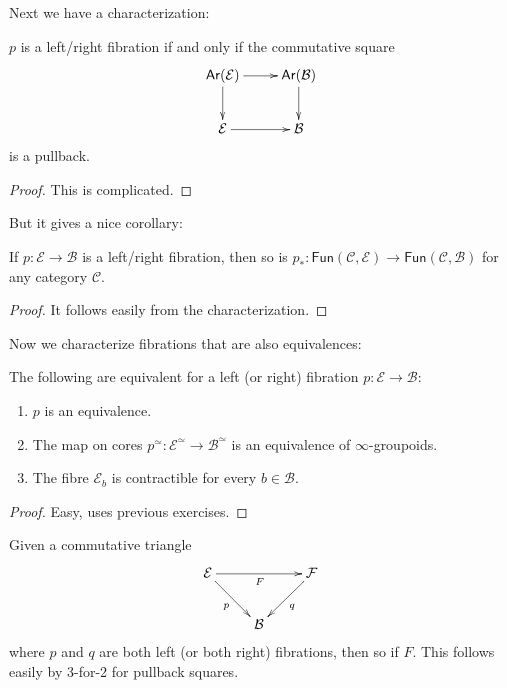 \noindent
Next we have a characterization:

\begin{proposition}
\label{proposition-fibration-characterization}
$p$ is a left/right fibration if and only if the commutative square
$$
\xymatrix{
\mathsf{Ar}(\mathcal{E})\ar[r]\ar[d]&\mathsf{Ar}(\mathcal{B})\ar[d]\\
\mathcal{E}\ar[r]&\mathcal{B}
}
$$
is a pullback.
\end{proposition}

\begin{proof}
This is complicated.
\end{proof}

\noindent
But it gives a nice corollary:

\begin{lemma}
\label{lemma-induced-map-fibration}
If $p:\mathcal{E}\to\mathcal{B}$ is a left/right fibration,
then so is $p_*:
\mathsf{Fun}(\mathcal{C},\mathcal{E})\to\mathsf{Fun}(\mathcal{C},\mathcal{B})$ 
for any category $\mathcal{C}$.
\end{lemma}

\begin{proof}
It follows easily from the characterization.
\end{proof}

\noindent
Now we characterize fibrations that are also equivalences:

\begin{proposition}
\label{proposition-fibration-equivalence}
The following are equivalent for a left (or right)
fibration $p:\mathcal{E} \to \mathcal{B}$:

\begin{enumerate}
\item $p$ is an equivalence.
\item The map on cores $p^\simeq:\mathcal{E}^\simeq\to\mathcal{B}^\simeq$
is an equivalence of $\infty$-groupoids.
\item The fibre $\mathcal{E}_b$ is contractible for every $b \in \mathcal{B}$.
\end{enumerate}
\end{proposition}

\begin{proof}
Easy, uses previous exercises. 
\end{proof}

\begin{remark}[3-for-2]
\label{remark-3-for-2}
Given a commutative triangle
$$
\xymatrix{
\mathcal{E} \ar[rd]_{p} \ar[rr]_{F} && \mathcal{F} \ar[dl]^{q} \\
& \mathcal{B}
}
$$
where $p$ and $q$ are both left (or both right)
fibrations, then so if $F$.
This follows easily by 3-for-2 for pullback squares.
\end{remark}

